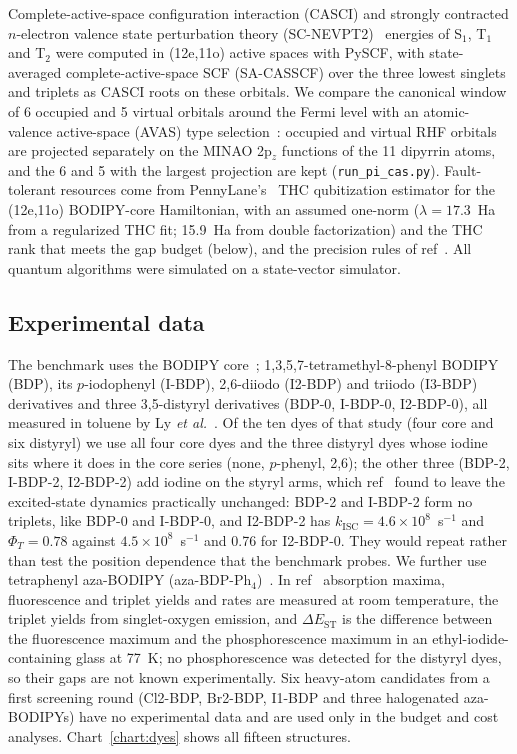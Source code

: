\documentclass[journal=jctcce,manuscript=article]{achemso}
\begin{document}
Complete-active-space configuration interaction (CASCI) and strongly contracted $n$-electron valence state
perturbation theory (SC-NEVPT2)~\cite{Angeli2001} energies of S$_1$, T$_1$ and T$_2$ were computed in
(12e,11o) active spaces with PySCF, with state-averaged complete-active-space SCF (SA-CASSCF) over the three lowest singlets and triplets as CASCI roots on
these orbitals. We compare the canonical window of 6 occupied and 5 virtual orbitals around the Fermi level with
an atomic-valence active-space (AVAS) type selection~\cite{Sayfutyarova2017}: occupied and virtual RHF orbitals are projected separately on the
MINAO 2p$_z$ functions of the 11 dipyrrin atoms, and the 6 and 5 with the largest projection are kept
(\texttt{run\_pi\_cas.py}). Fault-tolerant resources come from PennyLane's~\cite{Bergholm2018} THC
qubitization estimator for the (12e,11o) BODIPY-core Hamiltonian, with an assumed one-norm
($\lambda=17.3$~Ha from a regularized THC fit; 15.9~Ha from double factorization) and the THC rank that meets the gap budget (below), and the
precision rules of
ref~. All quantum algorithms were simulated on a state-vector simulator.

\subsection{Experimental data}

The benchmark uses the BODIPY core~\cite{Schmitt2009}; 1,3,5,7-tetramethyl-8-phenyl BODIPY (BDP), its
$p$-iodophenyl (I-BDP), 2,6-diiodo (I2-BDP) and triiodo (I3-BDP) derivatives and three 3,5-distyryl
derivatives (BDP-0, I-BDP-0, I2-BDP-0), all measured in toluene by Ly \emph{et al.}~\cite{Ly2021}. Of the ten
dyes of that study (four core and six distyryl) we use all four core dyes and the three distyryl dyes whose iodine
sits where it does in the core series (none, $p$-phenyl, 2,6); the other three (BDP-2, I-BDP-2, I2-BDP-2) add
iodine on the styryl arms, which ref~ found to leave the excited-state dynamics practically
unchanged: BDP-2 and I-BDP-2 form no triplets, like BDP-0 and I-BDP-0, and I2-BDP-2 has
$k_\mathrm{ISC}=4.6\times10^{8}$~s$^{-1}$ and $\Phi_T=0.78$ against $4.5\times10^{8}$~s$^{-1}$ and 0.76 for
I2-BDP-0. They would repeat rather than test the position dependence that the benchmark probes. We further use
tetraphenyl aza-BODIPY (aza-BDP-Ph$_4$)~\cite{Killoran2002,Loudet2008}. In ref~ absorption maxima, fluorescence and triplet yields and rates are measured at room temperature, the triplet yields from singlet-oxygen emission, and $\Delta E_\mathrm{ST}$ is the difference between the fluorescence maximum and the phosphorescence maximum in an ethyl-iodide-containing glass at 77~K; no phosphorescence was detected for the distyryl dyes, so their gaps are not known experimentally. Six heavy-atom candidates from a first screening round (Cl2-BDP, Br2-BDP, I1-BDP and
three halogenated aza-BODIPYs) have no experimental data and are used only in the budget and cost analyses.
Chart~\ref{chart:dyes} shows all fifteen structures.
\end{document}

